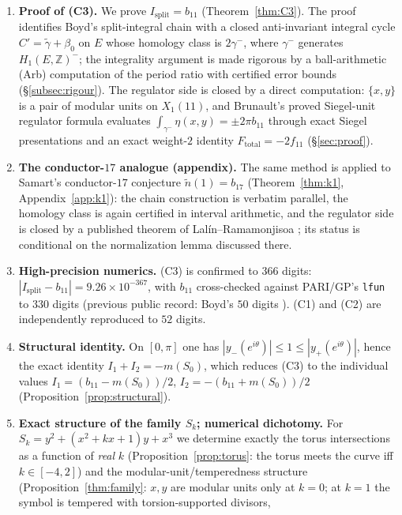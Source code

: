\documentclass[preprint,12pt]{elsarticle}
\theoremstyle{definition}
\theoremstyle{remark}
\newcommand{\Z}{\mathbb{Z}}
\begin{document}
\begin{enumerate}
  \item \textbf{Proof of (C3).} We prove
  $I_{\mathrm{split}}=b_{11}$ (Theorem~\ref{thm:C3}). The proof identifies
  Boyd's split-integral chain with a closed anti-invariant integral cycle
  $C'=\tilde\gamma+\beta_0$ on $E$ whose homology class is $2\gamma^-$, where
  $\gamma^-$ generates $H_1(E,\Z)^-$; the integrality argument is made
  rigorous by a ball-arithmetic (Arb) computation of the period ratio with
  certified error bounds (\S\ref{subsec:rigour}). The regulator side
  is closed by a direct computation: $\{x,y\}$ is a pair of modular units
  on $X_1(11)$, and Brunault's proved Siegel-unit regulator formula
  \cite{BrunaultSiegel} evaluates $\int_{\gamma^-}\eta(x,y)=\pm2\pi b_{11}$
  through exact Siegel presentations and an exact weight-$2$ identity
  $F_{\mathrm{total}}=-2f_{11}$ (\S\ref{sec:proof}).
  \item \textbf{The conductor-$17$ analogue (appendix).} The same method is
  applied to Samart's conductor-$17$ conjecture $\tilde n(1)=b_{17}$
  (Theorem~\ref{thm:k1}, Appendix~\ref{app:k1}): the chain construction is
  verbatim parallel, the homology class is again certified in interval
  arithmetic, and the regulator side is closed by a published theorem of
  Lal\'in--Ramamonjisoa \cite{LalinRam}; its status is conditional on the
  normalization lemma discussed there.
  \item \textbf{High-precision numerics.} (C3) is confirmed to $366$ digits:
  $|I_{\mathrm{split}}-b_{11}|=9.26\times10^{-367}$, with $b_{11}$
  cross-checked against PARI/GP's \texttt{lfun} to $330$ digits (previous
  public record: Boyd's $50$ digits \cite[p.~28]{Boyd2015}). (C1) and
  (C2) are independently reproduced to $52$ digits.
  \item \textbf{Structural identity.} On $[0,\pi]$ one has
  $|y_-(e^{i\theta})|\le 1\le |y_+(e^{i\theta})|$, hence the exact identity
  $I_1+I_2=-m(S_0)$, which reduces (C3) to the individual values
  $I_1=(b_{11}-m(S_0))/2$, $I_2=-(b_{11}+m(S_0))/2$
  (Proposition~\ref{prop:structural}).
  \item \textbf{Exact structure of the family $S_k$; numerical dichotomy.}
  For $S_k=y^2+(x^2+kx+1)y+x^3$ we determine exactly the torus intersections
  as a function of \emph{real} $k$ (Proposition~\ref{prop:torus}: the torus
  meets the curve iff $k\in[-4,2]$) and the modular-unit/temperedness
  structure (Proposition~\ref{thm:family}: $x,y$ are modular units only at
  $k=0$; at $k=1$ the symbol is tempered with torsion-supported divisors,

\end{enumerate}
\end{document}
